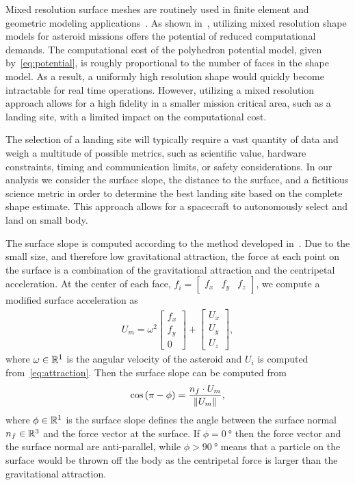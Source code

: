 \documentclass[letterpaper, paper,11pt]{AAS}		%
\begin{document}
Mixed resolution surface meshes are routinely used in finite element and geometric modeling applications~\cite{botsch2010}.
As shown in~\cite{mcmahon2017}, utilizing mixed resolution shape models for asteroid missions offers the potential of reduced computational demands.
The computational cost of the polyhedron potential model, given by~\cref{eq:potential}, is roughly proportional to the number of faces in the shape model.
As a result, a uniformly high resolution shape would quickly become intractable for real time operations.
However, utilizing a mixed resolution approach allows for a high fidelity in a smaller mission critical area, such as a landing site, with a limited impact on the computational cost.

The selection of a landing site will typically require a vast quantity of data and weigh a multitude of possible metrics, such as scientific value, hardware constraints, timing and communication limits, or safety considerations. 
In our analysis we consider the surface slope, the distance to the surface, and a fictitious science metric in order to determine the best landing site based on the complete shape estimate.
This approach allows for a spacecraft to autonomously select and land on small body.

The surface slope is computed according to the method developed in~\cite{scheeres1996}.
Due to the small size, and therefore low gravitational attraction, the force at each point on the surface is a combination of the gravitational attraction and the centripetal acceleration.
At the center of each face, \( f_i = \begin{bmatrix} f_x & f_y & f_z \end{bmatrix} \), we compute a modified surface acceleration as
\begin{align}\label{eq:surface_force}
    U_m = \omega^2 \begin{bmatrix} f_x \\ f_y \\ 0 \end{bmatrix} + \begin{bmatrix} U_x \\ U_y \\ U_z \end{bmatrix},
\end{align}
where \( \omega \in \mathbb{R}^1 \) is the angular velocity of the asteroid and \( U_i \) is computed from~\cref{eq:attraction}.
Then the surface slope can be computed from
\begin{align}\label{eq:surface_slope}
    \cos \left(  \pi - \phi  \right) = \frac{n_f \cdot U_m}{\left\| U_m \right\|},
\end{align}
where \( \phi \in \mathbb{R}^1 \) is the surface slope defines the angle between the surface normal \( n_f \in \mathbb{R}^3 \) and the force vector at the surface.
If \( \phi = \SI{0}{\degree} \) then the force vector and the surface normal are anti-parallel, while \( \phi > \SI{90}{\degree} \) means that a particle on the surface would be thrown off the body as the centripetal force is larger than the gravitational attraction.
\end{document}
